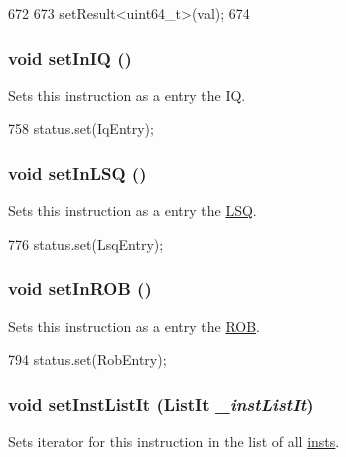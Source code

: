 \begin{DoxyCode}
672     {
673         setResult<uint64_t>(val);
674     }
\end{DoxyCode}
\hypertarget{classBaseDynInst_a453f140409e14d608c78d1ed1e72fef7}{
\subsubsection[{setInIQ}]{\setlength{\rightskip}{0pt plus 5cm}void setInIQ ()}}
\label{classBaseDynInst_a453f140409e14d608c78d1ed1e72fef7}
Sets this instruction as a entry the IQ. 


\begin{DoxyCode}
758 { status.set(IqEntry); }
\end{DoxyCode}
\hypertarget{classBaseDynInst_adba79e6ab3a1d6a3cc4157241830b086}{
\subsubsection[{setInLSQ}]{\setlength{\rightskip}{0pt plus 5cm}void setInLSQ ()}}
\label{classBaseDynInst_adba79e6ab3a1d6a3cc4157241830b086}
Sets this instruction as a entry the \hyperlink{classLSQ}{LSQ}. 


\begin{DoxyCode}
776 { status.set(LsqEntry); }
\end{DoxyCode}
\hypertarget{classBaseDynInst_a530dfc5f62fd422d1f4cc0e66074504e}{
\subsubsection[{setInROB}]{\setlength{\rightskip}{0pt plus 5cm}void setInROB ()}}
\label{classBaseDynInst_a530dfc5f62fd422d1f4cc0e66074504e}
Sets this instruction as a entry the \hyperlink{classROB}{ROB}. 


\begin{DoxyCode}
794 { status.set(RobEntry); }
\end{DoxyCode}
\hypertarget{classBaseDynInst_aeb6ae2640509c7f45f53c03d92f8f920}{
\subsubsection[{setInstListIt}]{\setlength{\rightskip}{0pt plus 5cm}void setInstListIt ({\bf ListIt} {\em \_\-instListIt})}}
\label{classBaseDynInst_aeb6ae2640509c7f45f53c03d92f8f920}
Sets iterator for this instruction in the list of all \hyperlink{namespaceinsts}{insts}. 


